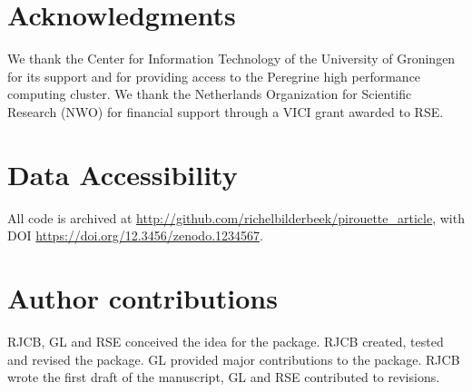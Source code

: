 \section{Acknowledgments}

We thank the Center for Information Technology of the University 
of Groningen for its support and for providing access to the Peregrine 
high performance computing cluster. 
We thank the Netherlands 
Organization for Scientific Research (NWO) for financial support 
through a VICI grant awarded to RSE.

\section{Data Accessibility}

All code is archived at 
\url{http://github.com/richelbilderbeek/pirouette_article},
with DOI \url{https://doi.org/12.3456/zenodo.1234567}.

\section{Author contributions}

RJCB, GL and RSE conceived the idea for the package. 
RJCB created, tested and revised the package.
GL provided major contributions to the package.
RJCB wrote the first draft of the manuscript, 
GL and RSE contributed to revisions.




